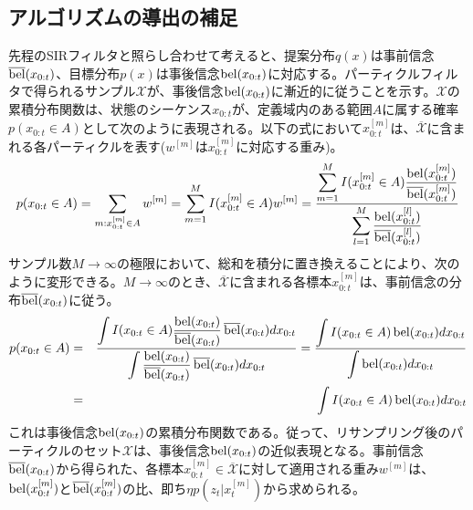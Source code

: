 \documentclass[dvipdfmx,a4paper]{jsarticle}
\begin{document}
\subsection{アルゴリズムの導出の補足}
先程のSIRフィルタと照らし合わせて考えると、提案分布$q(x)$は事前信念$\operatorname{\overline{bel}}(x_{0 : t})$、目標分布$p(x)$は事後信念$\operatorname{bel}(x_{0 : t})$に対応する。パーティクルフィルタで得られるサンプル$\mathcal{X}$が、事後信念$\operatorname{bel}(x_{0 : t})$に漸近的に従うことを示す。$\mathcal{X}$の累積分布関数は、状態のシーケンス$x_{0 : t}$が、定義域内のある範囲$A$に属する確率$p(x_{0 : t} \in A)$として次のように表現される。以下の式において$x_{0 : t}^{[m]}$は、$\overline{\mathcal{X}}$に含まれる各パーティクルを表す($w^{[m]}$は$x_{0 : t}^{[m]}$に対応する重み)。
\begin{equation}
	p(x_{0 : t} \in A) = \sum_{m : x_{0 : t}^{[m]} \in A} w^{[m]} = \sum_{m = 1}^M I(x_{0 : t}^{[m]} \in A) w^{[m]} = \frac{\displaystyle \sum_{m = 1}^M I(x_{0 : t}^{[m]} \in A) \frac{\operatorname{bel}(x_{0 : t}^{[m]})}{\operatorname{\overline{bel}}(x_{0 : t}^{[m]})}}{\displaystyle \sum_{l = 1}^M \frac{\operatorname{bel}(x_{0 : t}^{[l]})}{\operatorname{\overline{bel}}(x_{0 : t}^{[l]})}}
\end{equation}
サンプル数$M \to \infty$の極限において、総和を積分に置き換えることにより、次のように変形できる。$M \to \infty$のとき、$\overline{\mathcal{X}}$に含まれる各標本$x_{0 : t}^{[m]}$は、事前信念の分布$\operatorname{\overline{bel}}(x_{0 : t})$に従う。
\begin{eqnarray}
	p(x_{0 : t} \in A) &=& \frac{\displaystyle \int I(x_{0 : t} \in A) \frac{\operatorname{bel}(x_{0 : t})}{\operatorname{\overline{bel}}(x_{0 : t})} \operatorname{\overline{bel}}(x_{0 : t}) dx_{0 : t}}{\displaystyle \int \frac{\operatorname{bel}(x_{0 : t})}{\operatorname{\overline{bel}}(x_{0 : t})} \operatorname{\overline{bel}}(x_{0 : t}) dx_{0 : t}} = \frac{\displaystyle \int I(x_{0 : t} \in A) \operatorname{bel}(x_{0 : t}) dx_{0 : t}}{\displaystyle \int \operatorname{bel}(x_{0 : t}) dx_{0 : t}} \nonumber \\
	&=& \int I(x_{0 : t} \in A) \operatorname{bel}(x_{0 : t}) dx_{0 : t}
\end{eqnarray}
これは事後信念$\operatorname{bel}(x_{0 : t})$の累積分布関数である。従って、リサンプリング後のパーティクルのセット$\mathcal{X}$は、事後信念$\operatorname{bel}(x_{0 : t})$の近似表現となる。事前信念$\operatorname{\overline{bel}}(x_{0 : t})$から得られた、各標本$x_{0 : t}^{[m]} \in \overline{\mathcal{X}}$に対して適用される重み$w^{[m]}$は、$\operatorname{bel}(x_{0 : t}^{[m]})$と$\operatorname{\overline{bel}}(x_{0 : t}^{[m]})$の比、即ち$\eta p(z_t | x_t^{[m]})$から求められる。



\end{document}
